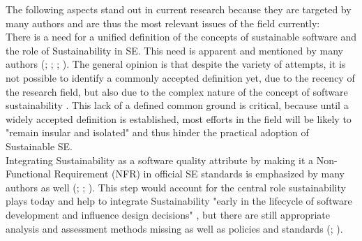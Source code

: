 \documentclass[oribibl]{llncs}
\begin{document}
The following aspects stand out in current research because they are targeted by many authors and are thus the most relevant issues of the field currently:\\
There is a need for a unified definition of the concepts of sustainable software and the role of Sustainability in SE. This need is apparent and mentioned by many authors (\cite{venters_software_2014}; \cite{becker_sustainability_2015}; \cite{calero_green_2015}; \cite{penzenstadler_what_13}). The general opinion is that despite the variety of attempts, it is not possible to identify a commonly accepted definition yet, due to the recency of the research field, but also due to the complex nature of the concept of software sustainability \cite{venters_software_2014}. %
This lack of a defined common ground is critical, because until a widely accepted definition is established, most efforts in the field will be likely to "remain insular and isolated" \cite[p.\,5]{venters_software_2014} and thus hinder the practical adoption of Sustainable SE.\\
Integrating Sustainability as a software quality attribute by making it a Non-Functional Requirement (NFR) in official SE standards is emphasized by many authors as well (\cite{penzenstadler_safety_2014}; \cite{amsel_toward_2011}; \cite{agarwal_sustainable_2012}). This step would account for the central role sustainability plays today \cite{penzenstadler_safety_2014} and help to integrate Sustainability "early in the lifecycle of software development and influence design decisions" \cite[p.\,2]{raturi_developing_2014}, but there are still appropriate analysis and assessment methods missing as well as policies and standards (\cite{penzenstadler_safety_2014}; \cite{venters_software_2014}).\\ %
\end{document}

